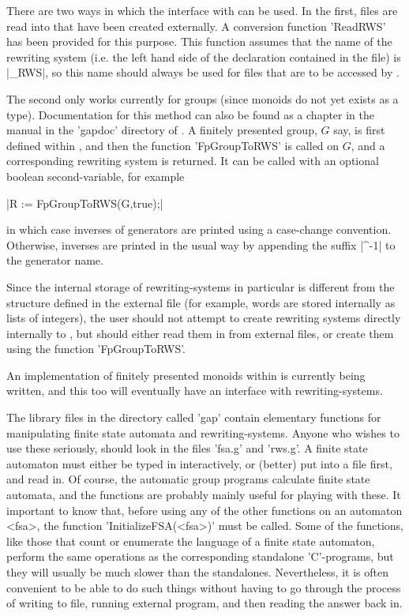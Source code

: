 
There are two ways in which the interface with {\GAP} can be used.
In the first, files are read into {\GAP} that have been created externally.
A {\GAP} conversion function 'ReadRWS' has been provided for this purpose.
This function assumes that the name of the rewriting system (i.e. the left
hand side of the declaration contained in the file) is |_RWS|, so this
name should always be used for files that are to be accessed by {\GAP}.

The second only works currently for groups (since monoids do not yet
exists as a {\GAP} type). Documentation for this method can also be found as
a chapter in the {\GAP} manual in the 'gapdoc' directory of {\KBMAG}.
A finitely presented group, $G$ say, is first
defined within {\GAP}, and then the {\GAP} function 'FpGroupToRWS' is called
on $G$, and a corresponding rewriting system is returned.
It can be called with an optional boolean second-variable, for example

|R := FpGroupToRWS(G,true);|

in which case inverses of generators are
printed using a case-change convention. Otherwise, inverses are printed in
the usual way by appending the suffix |^-1| to the generator name.

Since the internal storage of rewriting-systems in particular is
different from the structure defined in the external file (for example,
words are stored internally as lists of integers), the user should not
attempt to create rewriting systems directly internally to {\GAP},
but should either read them in from external files, or create them using the
function 'FpGroupToRWS'.

An implementation of finitely presented monoids within {\GAP} is currently
being written, and this too will eventually have an interface with
rewriting-systems.
 
The library files in the directory called 'gap' contain elementary functions
for manipulating finite state automata and rewriting-systems.
Anyone who wishes to use these seriously, should look in the files 'fsa.g' and
'rws.g'. A finite state automaton must either be typed in
interactively, or (better) put into a file first, and read in. Of course,
the automatic group programs calculate finite state automata, and the
functions are probably mainly useful for playing with these. It important to
know that, before using any of the other {\GAP} functions on an automaton <fsa>,
the function 'InitializeFSA(<fsa>)' must be called. Some of the functions,
like those that count or enumerate the language of a finite state automaton,
perform the same operations as the corresponding standalone 'C'-programs,
but they will usually be much slower than the standalones. Nevertheless,
it is often convenient to be able to do such things without having to go
through the process of writing to file, running external program, and then
reading the answer back in.

